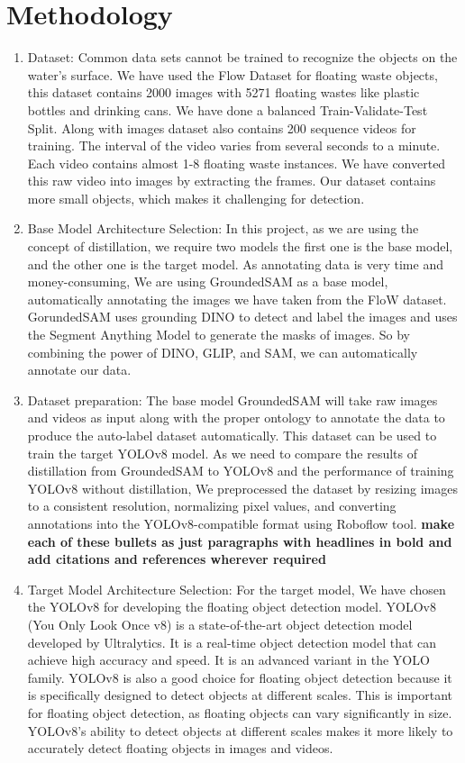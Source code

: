 \clearpage

\section{Methodology}

\noindent
\begin{enumerate}
    \item Dataset: 
    Common data sets cannot be trained to recognize the objects on the water's surface.  We have used the Flow Dataset for floating waste objects, this dataset contains 2000 images with 5271 floating wastes like plastic bottles and drinking cans. We have done a balanced Train-Validate-Test Split. Along with images dataset also contains 200 sequence videos for training. The interval of the video varies from several seconds to a minute. Each video contains almost 1-8 floating waste instances. 	We have converted this raw video into images by extracting the frames. Our dataset contains more small objects, which makes it challenging for detection.

\item Base Model Architecture Selection:
In this project, as we are using the concept of distillation, we require two models the first one is the base model, and the other one is the target model. As annotating data is very time and money-consuming, We are using GroundedSAM as a base model, automatically annotating the images we have taken from the FloW dataset. GorundedSAM uses grounding DINO to detect and label the images and uses the Segment Anything Model to generate the masks of images. So by combining the power of DINO, GLIP, and SAM, we can automatically annotate our data.


\item Dataset preparation:
The base model GroundedSAM will take raw images and videos as input along with the proper ontology to annotate the data to produce the auto-label dataset automatically. This dataset can be used to train the target YOLOv8 model.
As we need to compare the results of distillation from GroundedSAM to YOLOv8 and the performance of training YOLOv8 without distillation, We preprocessed the dataset by resizing images to a consistent resolution, normalizing pixel values, and converting annotations into the YOLOv8-compatible format using Roboflow tool. \textbf{make each of these bullets as just paragraphs with headlines in bold and add citations and references wherever required}


\item Target Model Architecture Selection:
For the target model, We have chosen the YOLOv8 for developing the floating object detection model. YOLOv8 (You Only Look Once v8) is a state-of-the-art object detection model developed by Ultralytics. It is a real-time object detection model that can achieve high accuracy and speed. It is an advanced variant in the YOLO family. YOLOv8 is also a good choice for floating object detection because it is specifically designed to detect objects at different scales. This is important for floating object detection, as floating objects can vary significantly in size. YOLOv8's ability to detect objects at different scales makes it more likely to accurately detect floating objects in images and videos.



\end{enumerate}

